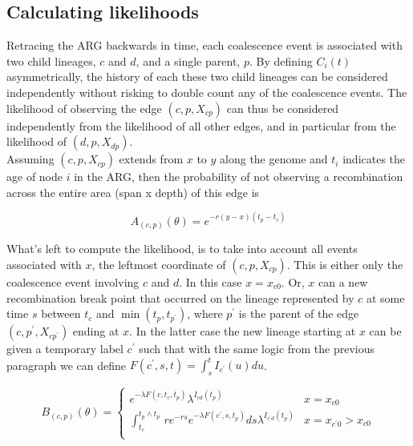 \documentclass{article}
\begin{document}
\subsection{Calculating likelihoods} \label{par:liks}

Retracing the ARG backwards in time, each coalescence event is associated with two child 
lineages, $c$ and $d$, and a single parent, $p$. By defining $C_i(t)$ asymmetrically, 
the history of each these two child lineages can be considered independently without 
risking to double count any of the coalescence events. The likelihood of 
observing the edge $(c, p, X_{cp})$ can thus be considered independently from 
the likelihood of all other edges, and in particular from the likelihood 
of $(d, p, X_{dp})$.\\

Assuming $(c, p, X_{cp})$ extends from $x$ to $y$ along the genome and $t_i$ 
indicates the age of 
node $i$ in the ARG, then the probability of not observing a recombination across the 
entire area (span x depth) of this edge is 

\begin{equation}\label{eq:span}
A_{(c, p)}(\theta) = e^{-r (y-x)(t_p - t_{c})}
\end{equation}

What's left to compute the likelihood, is to take into account all events 
associated with $x$, 
the leftmost coordinate of $(c, p, X_{cp})$. This is either only the 
coalescence event involving 
$c$ and $d$. In this case $x=x_{c0}$. Or, $x$ can a new recombination break point that 
occurred on the lineage represented by $c$ at some time $s$ between $t_{c}$ 
and $\min(t_p, t_{p^{\prime}})$, where $p^{\prime}$ is the parent of the 
edge $(c, p^{\prime}, X_{cp^{\prime}})$ ending at $x$.
In the latter case the new lineage starting at $x$ can be given a temporary label 
$c^{\prime}$ such that with the same logic from the previous paragraph we 
can define $F(c^{\prime}, s, t) = \int_{s}^{t} I_{c^{\prime}}(u)du$. 

\begin{equation}\label{eq:depth}
B_{(c, p)}(\theta) = \begin{cases}
e^{-\lambda F(c, t_c, t_p)} \lambda^{I_{cd}(t_p)} & x=x_{c0} \\
\int_{t_c}^{t_{p} \wedge t_{p^{\prime}}} r e^{-rs} e^{-\lambda F(c^{\prime}, s, t_{p})} ds \lambda^{I_{c^{\prime}d}(t_p)} & x=x_{c^{\prime}0}>x_{c0} \\
\end{cases}
\end{equation}
\end{document}

